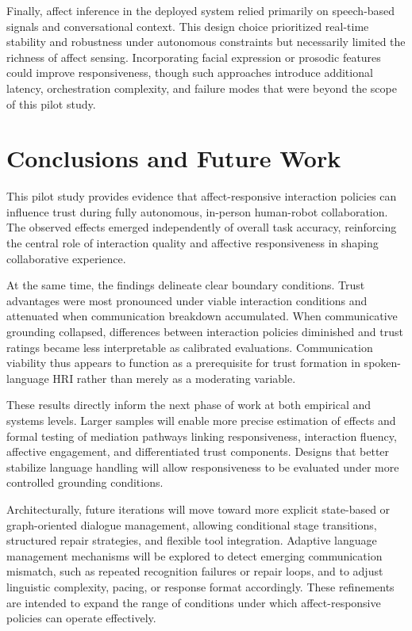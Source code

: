 \documentclass[
]{article}
\begin{document}
Finally, affect inference in the deployed system relied primarily on
speech-based signals and conversational context. This design choice
prioritized real-time stability and robustness under autonomous
constraints but necessarily limited the richness of affect sensing.
Incorporating facial expression or prosodic features could improve
responsiveness, though such approaches introduce additional latency,
orchestration complexity, and failure modes that were beyond the scope
of this pilot study.

\section{Conclusions and Future Work}\label{conclusions-and-future-work}

This pilot study provides evidence that affect-responsive interaction
policies can influence trust during fully autonomous, in-person
human-robot collaboration. The observed effects emerged independently of
overall task accuracy, reinforcing the central role of interaction
quality and affective responsiveness in shaping collaborative
experience.

At the same time, the findings delineate clear boundary conditions.
Trust advantages were most pronounced under viable interaction
conditions and attenuated when communication breakdown accumulated. When
communicative grounding collapsed, differences between interaction
policies diminished and trust ratings became less interpretable as
calibrated evaluations. Communication viability thus appears to function
as a prerequisite for trust formation in spoken-language HRI rather than
merely as a moderating variable.

These results directly inform the next phase of work at both empirical
and systems levels. Larger samples will enable more precise estimation
of effects and formal testing of mediation pathways linking
responsiveness, interaction fluency, affective engagement, and
differentiated trust components. Designs that better stabilize language
handling will allow responsiveness to be evaluated under more controlled
grounding conditions.

Architecturally, future iterations will move toward more explicit
state-based or graph-oriented dialogue management, allowing conditional
stage transitions, structured repair strategies, and flexible tool
integration. Adaptive language management mechanisms will be explored to
detect emerging communication mismatch, such as repeated recognition
failures or repair loops, and to adjust linguistic complexity, pacing,
or response format accordingly. These refinements are intended to expand
the range of conditions under which affect-responsive policies can
operate effectively.
\end{document}
